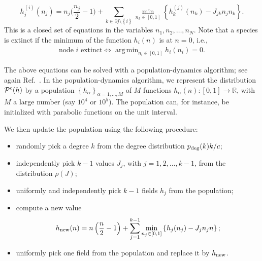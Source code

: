 \documentclass[11pt,a4paper]{article}
\DeclareMathOperator*{\argmin}{arg\,min}
\begin{document}
\begin{equation}
    h^{(i)}_j(n_j) = n_j \bigg( \frac{n_j}{2} - 1 \bigg) + \sum_{k \in \partial j \setminus \left\{ i \right\}}\min_{n_k \in [0,1]} \left\{h^{(j)}_k(n_k) - J_{jk} n_j n_k\right\}.
    \label{eq:cav}
\end{equation}
This is a closed set of equations in the variables $n_1, n_2, \dots, n_N$.
Note that a species is extinct if the minimum of the function $h_i(n)$ is at $n=0$, i.e.,
\begin{align}
    \text{node $i$ extinct} \iff \argmin_{n_i \in [0,1]} h_i(n_i) = 0.
\end{align}

































The above equations can be solved with a population-dynamics algorithm; see again Ref.~\cite{mezard2003cavity}. In the population-dynamics algorithm, we represent the distribution $\mathcal{P}^{\rm c}(h)$ by a population $\left\{h_\alpha\right\}_{\alpha=1,\ldots,M}$ of $M$ functions $h_{\alpha}(n):[0,1]\rightarrow \mathbb{R}$, with $M$ a large number (say $10^4$ or $10^5$). The population can, for instance, be initialized with parabolic functions on the unit interval.

We then update the population using the following procedure:
\begin{itemize}
\item randomly pick a degree $k$ from the degree distribution $p_{\rm deg}(k)k/c$;
\item independently pick $k-1$ values $J_j$, with $j=1,2,\ldots,k-1$, from the distribution $\rho(J)$;
\item uniformly and independently pick $k-1$ fields $h_j$ from the population;
\item compute a new value
\begin{equation}
    h_{\rm new}(n) = n\left(\frac{n}{2}-1\right) + \sum^{k-1}_{j=1}\min_{n_j\in [0,1]} \left\{h_j(n_j)-J_{j}n_jn\right\};
\end{equation}
\item uniformly pick one field from the population and replace it by $h_{\rm new}$.
\end{itemize}
\end{document}
